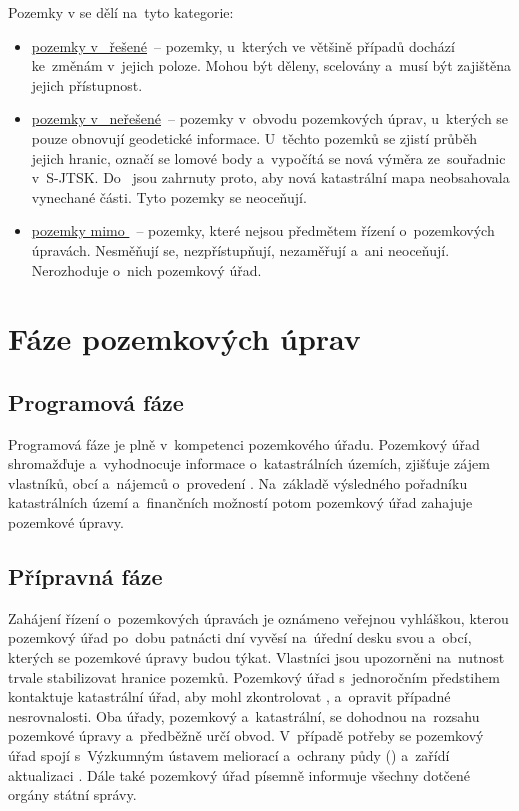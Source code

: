 Pozemky v  se dělí na~tyto kategorie:
\vspace{-\topsep}
	\begin{itemize}[leftmargin=1.5cm, noitemsep]
        \item \underline{pozemky v~ řešené}~– pozemky,
          u~kte\-rých ve většině případů dochází ke~změnám v~jejich
          poloze. Mohou být děleny, scelovány a~musí být zajištěna
          jejich přístupnost.
        \item \underline{pozemky v~ neřešené}~– pozemky
          v~obvodu pozemkových úprav, u~kte\-rých se pouze obnovují
          geodetické informace. U~těchto pozemků se zjistí průběh
          jejich hranic, označí se lomové body a~vypočítá se nová
          výměra ze~souřadnic v~S-JTSK. Do~ jsou zahrnuty
          proto, aby nová katastrální mapa neobsahovala vynechané
          části. Tyto pozemky se neoceňují.
        \item \underline{pozemky mimo }~– pozemky, které
          nejsou předmětem řízení o~pozem\-kových úpravách. Nesměňují
          se, nezpřístupňují, nezaměřují a~ani neoceňují. Nerozhoduje
          o~nich pozemkový úřad.
	\end{itemize}

\section{Fáze pozemkových úprav}
\label{etapy_pu}

\subsection{Programová fáze}
\label{programova_faze}

Programová fáze je plně v~kompetenci pozemkového úřadu. Pozemkový úřad
shromažďuje a~vyhodnocuje informace o~katastrálních územích, zjišťuje
zájem vlastníků, obcí a~nájemců o~provedení . Na~základě
výsledného pořadníku katastrálních území a~finančních možností potom
pozemkový úřad zahajuje pozemkové úpravy.

\subsection{Přípravná fáze}
\label{pripravna_faze}

Zahájení řízení o~pozemkových úpravách je oznámeno veřejnou vyhláškou,
kterou pozemkový úřad po~dobu patnácti dní vyvěsí na~úřední desku svou
a~obcí, kterých se pozemkové úpravy budou týkat. Vlastníci jsou
upozorněni na~nutnost trvale stabilizovat hranice pozemků. Pozemkový
úřad s~jednoročním předstihem kontaktuje katastrální úřad, aby mohl
zkontrolovat ,  a~opravit případné nesrovnalosti. Oba
úřady, pozemkový a~katastrální, se dohodnou na~rozsahu pozemkové
úpravy a~předběžně určí obvod. V~případě potřeby se pozemkový úřad
spojí s~Výzkumným ústavem meliorací a~ochrany půdy ()
a~zařídí aktualizaci . Dále také pozemkový úřad písemně
informuje všechny dotčené orgány státní správy.

